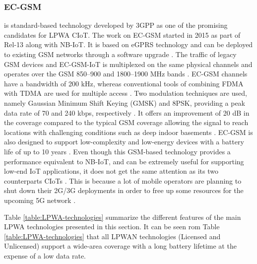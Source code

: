\documentclass[]{IEEEtran}
\begin{document}
\subsubsection{EC-GSM}
\label{sec:2-2-3}
is standard-based technology developed by 3GPP as one of the promising candidates for LPWA CIoT. The work on EC-GSM started in 2015 as part of Rel-13 \cite{TR_45.820} along with NB-IoT. It is based on eGPRS technology and can be deployed to existing GSM networks through a software upgrade \cite{poursafar2017long}. The traffic of legacy GSM devices and EC-GSM-IoT is multiplexed on the same physical channels \cite{chaudhari2020lpwan} and operates over the GSM 850–900 and 1800–1900 MHz bands \cite{herrero_fundamentals_2021}. EC-GSM channels have a bandwidth of 200 kHz, whereas conventional tools of combining FDMA with TDMA are used for multiple access \cite{liberg_cellular_2019}. 
Two modulation techniques are used, namely Gaussian Minimum Shift Keying (GMSK) and 8PSK, providing a peak data rate of 70 and 240 kbps, respectively \cite{raza2017low}. It offers an improvement of 20 dB in the coverage compared to the typical GSM coverage\cite{hwang_survey_2019} allowing the signal to reach locations with challenging conditions such as deep indoor basements \cite{chaudhari2020lpwan}. EC-GSM is also designed to support low-complexity and low-energy devices with a battery life of up to 10 years \cite{poursafar2017long}.
Even though this GSM-based technology provides a performance equivalent to NB-IoT, and can be extremely useful for supporting low-end IoT applications, it does not get the same attention as its two counterparts CIoTs \cite{foubert2020long}. This is because a lot of mobile operators are planning to shut down their 2G/3G deployments in order to free up some resources for the upcoming 5G network \cite{noauthor_complete_2019}.






Table \ref{table:LPWA-technologies} summarize the different features of the main LPWA technologies presented in this section. It can be seen rom Table \ref{table:LPWA-technologies} that all LPWAN technologies (Licensed and Unlicensed) support a wide-area coverage with a long battery lifetime at the expense of a low data rate.
\end{document}
